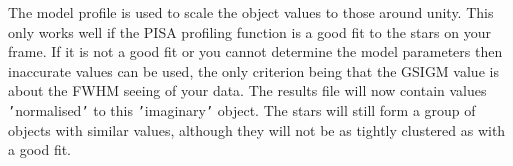 {{{         \sstitem
         The model profile is used to scale the object values to those
         around unity. This only works well if the PISA profiling function
         is a good fit to the stars on your frame. If it is not a good fit
         or you cannot determine the model parameters then inaccurate
         values can be used, the only criterion being that the GSIGM value
         is about the FWHM seeing of your data. The results file will now
         contain values {\tt '}normalised{\tt '} to this {\tt '}imaginary{\tt '} object. The stars
         will still form a group of objects with similar values, although
         they will not be as tightly clustered as with a good fit.
      }
   }
}
\newpage
{}
